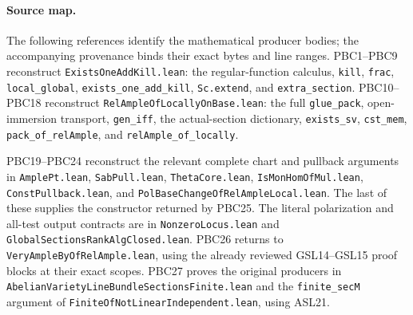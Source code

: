 \paragraph{Source map.}
The following references identify the mathematical producer bodies;
the accompanying provenance binds their exact bytes and line ranges.
PBC1--PBC9 reconstruct
\texttt{Exists\allowbreak One\allowbreak Add\allowbreak Kill.lean}: the regular-function calculus,
\texttt{kill}, \texttt{frac}, \texttt{local\_global},
\texttt{exists\_one\_add\_kill}, \texttt{Sc.extend}, and
\texttt{extra\_section}.
PBC10--PBC18 reconstruct
\texttt{Rel\allowbreak Ample\allowbreak Of\allowbreak Locally\allowbreak On\allowbreak Base.lean}: the full
\texttt{glue\_pack}, open-immersion transport,
\texttt{gen\_iff}, the actual-section dictionary,
\texttt{exists\_sv}, \texttt{cst\_mem},
\texttt{pack\_of\_relAmple}, and
\texttt{relAmple\_of\_locally}.

PBC19--PBC24 reconstruct the relevant complete chart and pullback
arguments in \texttt{AmplePt.lean}, \texttt{SabPull.lean},
\texttt{ThetaCore.lean}, \texttt{IsMonHomOfMul.lean},
\texttt{ConstPullback.lean}, and
\texttt{Pol\allowbreak Base\allowbreak Change\allowbreak Of\allowbreak Rel\allowbreak Ample\allowbreak Local.lean}.
The last of these supplies the constructor returned by PBC25.
The literal polarization and all-test output contracts are in
\texttt{NonzeroLocus.lean} and
\texttt{GlobalSectionsRankAlgClosed.lean}.
PBC26 returns to
\texttt{VeryAmpleByOfRelAmple.lean}, using the already reviewed
GSL14--GSL15 proof blocks at their exact scopes.
PBC27 proves the original producers in
\texttt{AbelianVarietyLineBundleSectionsFinite.lean} and
the \texttt{finite\_secM} argument of
\texttt{FiniteOfNotLinearIndependent.lean}, using ASL21.
